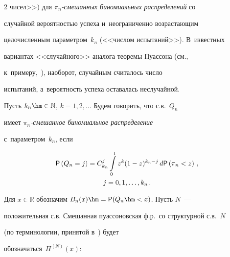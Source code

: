\begin{multicols}{2}
чисел>>) для \textit{$\pi_n$-сме\-шан\-ных биномиальных распределений} со


случайной ве\-ро\-ят\-ностью успеха и~неограниченно возрастающим


це\-ло\-чис\-лен\-ным параметром~$k_n$ (<<чис\-лом испытаний>>). В~известных


вариантах <<случайного>> аналога тео\-ре\-мы Пуассона (см., 


к~примеру,~\cite{KorolevBeningShorgin2011}), наоборот, случайным считалось число


испытаний, а~вероятность успеха оставалась неслучайной.





Пусть $k_n\hm\in\mathbb{N}$, $k=1,2,\ldots$ Будем говорить, что с.в.~$Q_n$ 


имеет \textit{$\pi_n$-сме\-шан\-ное биномиальное распределение} 


с~параметром~$k_n$, если





\vspace*{-2pt} 





\noindent


\begin{multline}


 {\sf P}\left(Q_n=j\right)=C_{k_n}^j\int\limits_{0}^{1}z^k(1-z)^{k_n-j}\,


d{\sf P}\left(\pi_n<z\right)\,,\\ j=0,1,\ldots,k_n\,.


\label{e1-kk}


\end{multline}





\vspace*{-2pt}





\noindent


Для $x\in\mathbb{R}$ обозначим $B_n(x)\hm={\sf P}(Q_n\hm<x)$. Пусть $N$~---


положительная с.в. Смешанная пуассоновская ф.р.\ со структурной с.в.~$N$ 


(по терминологии, принятой в~\cite{Grandell1997}) будет


обозначаться~$\Pi^{(N)}(x)$:


$$



\end{multicols}

